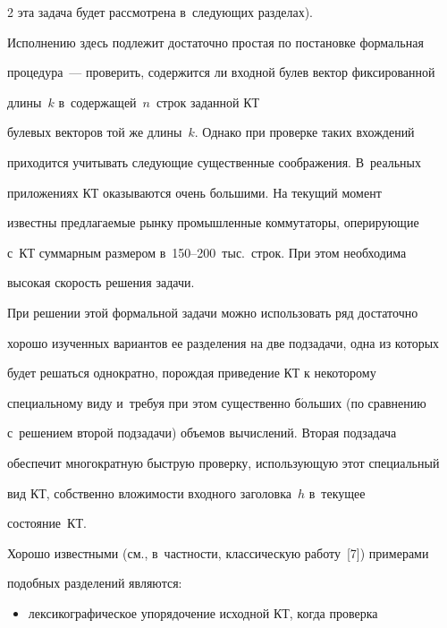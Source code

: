 \begin{multicols}{2}
эта задача будет рассмотрена в~следующих разделах). 


Исполнению здесь подлежит достаточно простая по постановке формальная 


процедура~--- проверить, содержится ли входной булев вектор фиксированной 


длины~$k$ в~содержащей~$n$~строк заданной КТ 


булевых векторов той же длины~$k$. Однако при проверке таких вхождений 


приходится учитывать следующие существенные соображения. В~реальных 


приложениях КТ оказываются очень большими. На текущий момент 


известны предлагаемые рынку промышленные коммутаторы, оперирующие 


с~КТ суммар\-ным размером в~150--200~тыс.\ строк. При этом необходима 


высокая скорость решения задачи.


{





}


  


  При решении этой формальной задачи \mbox{можно} использовать ряд достаточно 


хорошо изученных вариан\-тов ее разделения на две подзадачи, одна из которых 


будет решаться однократно, порождая приведение КТ к некоторому 


специальному виду и~требуя при этом существенно б$\acute{\mbox{о}}$льших (по сравнению 


с~решением второй подзадачи) объемов вычисле\-ний. Вторая подзадача 


обеспечит многократную быструю проверку, использующую этот специальный 


вид КТ, собственно вложимости входного заголовка~$h$ в~текущее 


состояние~КТ.


  


  Хорошо известными (см., в~частности, классическую работу~[7]) примерами 


подобных разделений являются:


\begin{itemize}


\item лексикографическое упорядочение исходной КТ, когда проверка 



\end{itemize}
\end{multicols}
